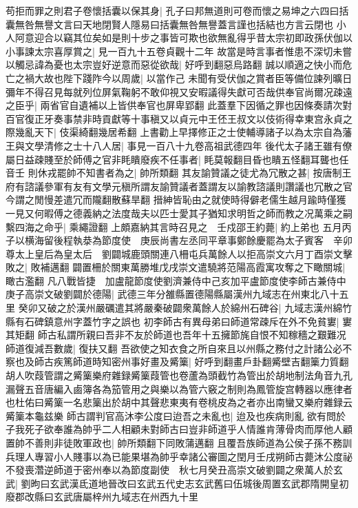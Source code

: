 苟拒而罪之則君子卷懷括囊以保其身|{
	孔子曰邦無道則可卷而懷之易坤之六四曰括囊無咎無譽文言曰天地閉賢人隱易曰括囊無咎無譽蓋言謹也括結也方言云閉也}
小人阿意迎合以竊其位矣如是則十步之事皆可欺也欲無亂得乎昔太宗初即政孫伏伽以小事諫太宗喜厚賞之|{
	見一百九十五卷貞觀十二年}
故當是時言事者惟患不深切未嘗以觸忌諱為憂也太宗豈好逆意而惡從欲哉|{
	好呼到翻惡烏路翻}
誠以順適之快小而危亡之禍大故也陛下踐阼今以周歲|{
	以當作己}
未聞有受伏伽之賞者臣等備位諫列曠日彌年不得召見每就列位屏氣鞠躬不敢仰視又安暇議得失獻可否哉供奉官尚爾况疎遠之臣乎|{
	兩省官自遺補以上皆供奉官也屏卑郢翻}
此蓋羣下因循之罪也因條奏請次對百官復正牙奏事禁非時貢獻等十事稹又以貞元中王伾王叔文以伎術得幸東宫永貞之際幾亂天下|{
	伎渠綺翻幾居希翻}
上書勸上早擇修正之士使輔導諸子以為太宗自為藩王與文學清修之士十八人居|{
	事見一百八十九卷高祖武德四年}
後代太子諸王雖有僚屬日益疎賤至於師傅之官非眊瞶廢疾不任事者|{
	眊莫報翻目昏也瞶五怪翻耳聾也任音壬}
則休戎罷帥不知書者為之|{
	帥所類翻}
其友諭贊議之徒尤為冗散之甚|{
	按唐制王府有諮議參軍有友有文學元稹所謂友諭贊議者蓋謂友以諭教諮議則讚議也冗散之官今謂之閒慢差遣冗而隴翻散蘇旱翻}
搢紳皆恥由之就使時得僻老儒生越月踰時僅獲一見又何暇傅之德義納之法度哉夫以匹士愛其子猶知求明哲之師而教之况萬乘之嗣繫四海之命乎|{
	乘繩證翻}
上頗嘉納其言時召見之　壬戍邵王約薨|{
	約上弟也}
五月丙子以横海留後程執㳟為節度使　庚辰尚書左丞同平章事鄭餘慶罷為太子賓客　辛卯尊太上皇后為皇太后　劉闢城鹿頭關連八柵屯兵萬餘人以拒高崇文六月丁酉崇文擊敗之|{
	敗補邁翻}
闢置柵於關東萬勝堆戊戌崇文遣驍將范陽高霞寓攻奪之下瞰關城|{
	瞰古濫翻}
凡八戰皆捷　加盧龍節度使劉濟兼侍中己亥加平盧節度使李師古兼侍中　庚子高崇文破劉闢於德陽|{
	武德三年分雒縣置德陽縣屬漢州九域志在州東北八十五里}
癸卯又破之於漢州嚴礪遣其將嚴秦破闢衆萬餘人於綿州石碑谷|{
	九域志漢州綿竹縣有石碑鎮意州字蓋竹字之誤也}
初李師古有異母弟曰師道常疎斥在外不免貧寠|{
	寠其矩翻}
師古私謂所親曰吾非不友於師道也吾年十五擁節旄自恨不知稼穡之艱難况師道復減吾數歲|{
	復扶又翻}
吾欲使之知衣食之所自來且以州縣之務付之計諸公必不察也及師古疾篤師道時知密州事好畫及觱篥|{
	好呼到翻畫戶卦翻觱壁吉翻篥力質翻胡人吹葭管謂之觱篥樂府雜録觱篥葭管也卷蘆為頭截竹為管出於胡地制法角音九孔漏聲五音唐編入鹵簿各為笳管用之與樂以為管六竅之制則為鳳管旋宫轉器以應律者也杜佑曰觱篥一名悲篥出於胡中其聲悲東夷有卷桃皮為之者亦出南蠻又樂府雜録云觱篥本龜兹樂}
師古謂判官高沐李公度曰迨吾之未亂也|{
	迨及也疾病則亂}
欲有問於子我死子欲奉誰為帥乎二人相顧未對師古曰豈非師道乎人情誰肯薄骨肉而厚他人顧置帥不善則非徒敗軍政也|{
	帥所類翻下同敗蒲邁翻}
且覆吾族師道為公侯子孫不務訓兵理人專習小人賤事以為已能果堪為帥乎幸諸公審圖之閏月壬戌朔師古薨沐公度祕不發喪濳逆師道于密州奉以為節度副使　秋七月癸丑高崇文破劉闢之衆萬人於玄武|{
	劉昫曰玄武漢氐道地晉改曰玄武五代史志玄武舊曰伍城後周置玄武郡隋開皇初廢郡改縣曰玄武唐屬梓州九域志在州西九十里}
